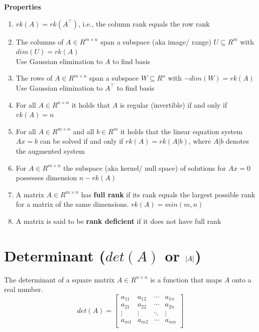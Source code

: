 \vspace{0.2cm}
\noindent\textbf{Properties}
\begin{enumerate}
    \item $rk(A) = rk(A^\top )$, i.e., the column rank equals the row rank

    \item The columns of $A \in  R^{m\times n}$ span a subspace (aka image/ range) $U \subseteq R^m$ with $dim(U) = rk(A)$\\
    Use Gaussian elimination to $A$ to find basis
    
    \item The rows of $A \in  R^{m\times n}$ span a subspace $W \subseteq R^n$ with $-dim(W) = rk(A)$\\
    Use Gaussian elimination to $A^\top$ to find basis
    
    \item For all $A \in  R^{n\times n}$ it holds that $A$ is regular (invertible) if and only if $rk(A) = n$
    
    \item For all $A \in  R^{m\times n}$ and all $b \in  R^m$ it holds that the linear equation system $Ax = b$ can be solved if and only if $rk(A) = rk(A|b)$, where $A|b$ denotes the augmented system
    
    \item For $A \in  R^{m\times n}$ the subspace (aka kernel/ null space) of solutions for $Ax = 0$ possesses dimension $n - rk(A)$
    
    \item A matrix $A \in  R^{m\times n}$ has \textbf{full rank} if its rank equals the largest possible rank for a matrix of the same dimensions. $rk(A) = min(m, n)$
    
    \item A matrix is said to be \textbf{rank deficient} if it does not have full rank
\end{enumerate}

\section{Determinant ($det(A)$ or $\left| A \right|$)}\label{matrix: Determinant}
The determinant of a square matrix $A \in R^{n\times n}$ is a function that maps $A$ onto a real number.
\[
    det(A) = \begin{bmatrix}
        a_{11} & a_{12} & \cdots & a_{1n} \\
        a_{21} & a_{22} & \cdots & a_{2n} \\
        \vdots & \vdots & \ddots & \vdots \\
        a_{m1} & a_{m2} & \cdots & a_{mn} \\
    \end{bmatrix}
\]

